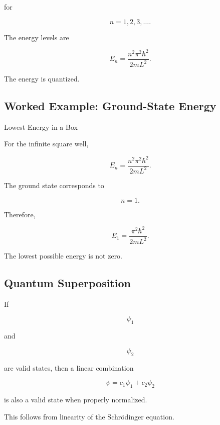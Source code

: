 for

\[
n=1,2,3,\ldots.
\]

The energy levels are

\[
\boxed{
E_n
=
\frac{n^2\pi^2\hbar^2}
{2mL^2}.
}
\]

The energy is quantized.

\subsection{Worked Example: Ground-State Energy}
\label{subsec:worked-ground-state-energy}

\begin{workedexamplebox}{Lowest Energy in a Box}

For the infinite square well,

\[
E_n
=
\frac{n^2\pi^2\hbar^2}
{2mL^2}.
\]

The ground state corresponds to

\[
n=1.
\]

Therefore,

\begin{answerbox}
\[
\boxed{
E_1
=
\frac{\pi^2\hbar^2}
{2mL^2}.
}
\]
\end{answerbox}

The lowest possible energy is not zero.

\end{workedexamplebox}

\subsection{Quantum Superposition}
\label{subsec:quantum-superposition}

If

\[
\psi_1
\]

and

\[
\psi_2
\]

are valid states, then a linear combination

\[
\boxed{
\psi
=
c_1\psi_1+c_2\psi_2
}
\]

is also a valid state when properly normalized.

This follows from linearity of the Schrödinger equation.


